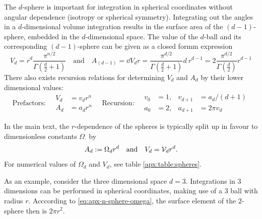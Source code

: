 \documentclass[12pt,a4paper]{report}
\numberwithin{equation}{chapter}
\begin{document}
\begin{appendices}
The $d$-sphere is important for integration in spherical coordinates without angular dependence (isotropy or spherical symmetry). Integrating out the angles in a $d$-dimensional volume integration results in the surface area of the $(d-1)$-sphere, embedded in the $d$-dimensional space. The value of the $d$-ball and its corresponding $(d-1)$-sphere can be given as a closed formm expression
%
\begin{equation}\label{eq:apx-n-sphere-VdAd}
V_d = r^d \frac{\pi^{n/2}}{\Gamma\left( \frac{d}{2} + 1\right)}
\quad\text{and}\quad
A_{(d-1)} = \dd{V_d}{r} = \frac{\pi^{d/2}}{\Gamma\left(\frac{d}{2}+1\right)} d~r^{d-1}
= 2 \frac{\pi^{d/2}}{\Gamma\left(\frac{d}{2}\right)} r^{d-1}
\end{equation}
There also exists recursion relations for determining $V_d$ and $A_d$ by their lower dimensional values: %
\begin{equation}
\text{Prefactors:}\quad 
\begin{aligned}
V_d &=v_d r^n \\
A_d &= a_d r^n
\end{aligned} \quad \text{Recursion:}\quad
\begin{aligned}
v_0 &= 1, &v_{d+1} &= a_d / (d+1) \\
a_0 &= 2, &a_{d+1} &= 2\pi v_d
\end{aligned}
\end{equation}

In the main text, the $r$-dependence of the spheres is typically split up in favour to dimensionless constants $\Omega_\cdot$ by
\begin{equation}\label{eq:apx-n-sphere-omega}
A_d:=\Omega_d r^d
\quad\text{and}\quad
V_d={\cal V}_d r^d.
\end{equation}
For numerical values of $\Omega_d$ and $V_d$, see table \ref{apx:table:spheres}.

As an example, consider the three dimensional space $d=3$. Integrations in $3$ dimensions can be performed in spherical coordinates, making use of a $3$ ball with radius $r$. Acccording to \eqref{eq:apx-n-sphere-omega}, the surface element of the $2$-sphere then is $2\pi r^2$.


\end{appendices}
\end{document}
